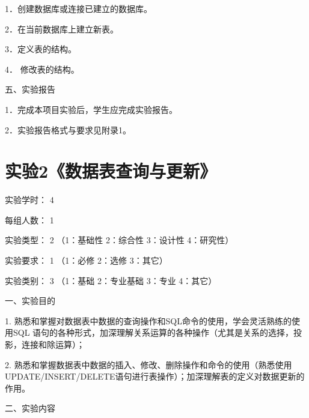 \documentclass[
]{article}
\begin{document}
1．创建数据库或连接已建立的数据库。

2．在当前数据库上建立新表。

3．定义表的结构。

4． 修改表的结构。

五、实验报告

1．完成本项目实验后，学生应完成实验报告。

2．实验报告格式与要求见附录1。

\hypertarget{ux5b9eux9a8c2ux6570ux636eux8868ux67e5ux8be2ux4e0eux66f4ux65b0}{%
\section{实验2《数据表查询与更新》}\label{ux5b9eux9a8c2ux6570ux636eux8868ux67e5ux8be2ux4e0eux66f4ux65b0}}

实验学时： { 4}

每组人数： { 1}

实验类型： { 2} （1：基础性 2：综合性 3：设计性 4：研究性）

实验要求： { 1} （1：必修 2：选修 3：其它）

实验类别： { 3} （1：基础 2：专业基础 3：专业 4：其它）

{}

一、实验目的

1.
熟悉和掌握对数据表中数据的查询操作和SQL命令的使用，学会灵活熟练的使用SQL
语句的各种形式，加深理解关系运算的各种操作（尤其是关系的选择，投影，连接和除运算）；

2.
熟悉和掌握数据表中数据的插入、修改、删除操作和命令的使用（熟悉使用UPDATE/INSERT/DELETE语句进行表操作）；加深理解表的定义对数据更新的作用。

二、实验内容
\end{document}
